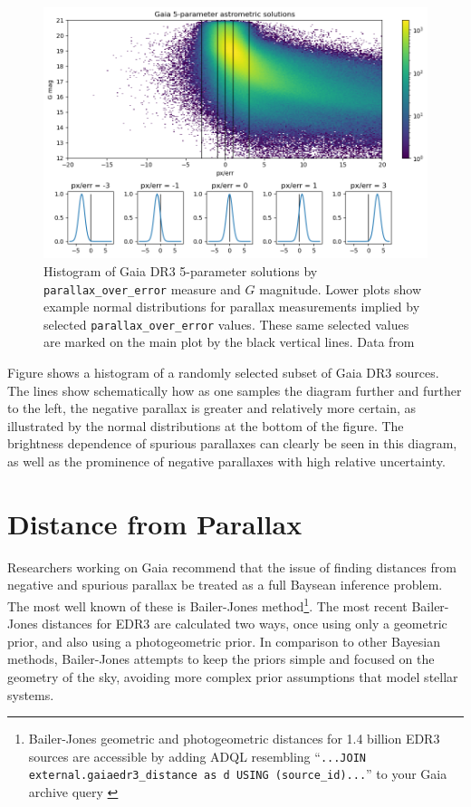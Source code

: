 \documentclass[preprint2]{aastex631}
\begin{document}
\begin{figure}
	\includegraphics[width=\columnwidth]{poe_map.png}
	\caption{Histogram of Gaia DR3 5-parameter solutions by \texttt{parallax\_over\_error} measure and $G$ magnitude. Lower plots show example normal distributions for parallax measurements implied by selected \texttt{parallax\_over\_error} values. These same selected values are marked on the main plot by the black vertical lines. Data from \cite{collaborationGaia2022}}
	\label{fig:dr3poe}
\end{figure}

Figure \label{fig:dr3poe} shows a histogram of a randomly selected subset of Gaia DR3 sources. The lines show schematically how as one samples the diagram further and further to the left, the negative parallax is greater and relatively more certain, as illustrated by the normal distributions at the bottom of the figure. The brightness dependence of spurious parallaxes can clearly be seen in this diagram, as well as the prominence of negative parallaxes with high relative uncertainty. 


\section{Distance from Parallax} \label{sec:distance}

Researchers working on Gaia recommend that the issue of finding distances from negative and spurious parallax be treated as a full Baysean inference problem\citep{luriGaia2018}. The most well known of these is Bailer-Jones method\footnote{Bailer-Jones geometric and photogeometric distances for 1.4 billion EDR3 sources are accessible by adding ADQL resembling ``\texttt{...JOIN external.gaiaedr3\_distance as d USING (source\_id)...}'' to your Gaia archive query \citep{bailer-jonesEstimating2021}}. The most recent Bailer-Jones distances for EDR3 are calculated two ways, once using only a geometric prior, and also using a photogeometric prior. In comparison to other Bayesian methods, Bailer-Jones attempts to keep the priors simple and focused on the geometry of the sky, avoiding more complex prior assumptions that model stellar systems.
\end{document}
